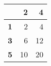 \begin{tabular}{r|rr}
\toprule
{} &   2 &   4 \\
\midrule
\textbf{1} &   2 &   4 \\
\textbf{3} &   6 &  12 \\
\textbf{5} &  10 &  20 \\
\bottomrule
\end{tabular}
